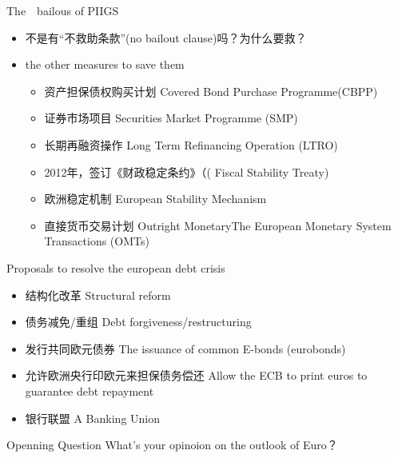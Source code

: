 \documentclass[10pt,hyperref={CJKbookmarks=true},xcolor=dvipsnames,aspectratio=169]{beamer}
\begin{document}
\begin{frame}{The　bailous of PIIGS}
		\begin{itemize}
			\item 不是有“不救助条款”(no bailout clause)吗？为什么要救？
			\item the other measures to save them
			\begin{itemize}
				\item 资产担保债权购买计划 Covered Bond Purchase Programme(CBPP)
				\item 证券市场项目 Securities Market	Programme (SMP)
				\item 长期再融资操作 Long Term Refinancing Operation (LTRO)
				\item 2012年，签订《财政稳定条约》（( Fiscal Stability
				Treaty)		
				\item 	欧洲稳定机制 European Stability Mechanism
				\item 直接货币交易计划 Outright MonetaryThe European Monetary System Transactions (OMTs)
							
		\end{itemize}
		\end{itemize}
\end{frame}

\begin{frame}{Proposals to resolve the european debt crisis}
	\begin{itemize}
	\item 结构化改革 Structural reform
	\item 债务减免/重组 Debt forgiveness/restructuring
	\item 发行共同欧元债券 The issuance of common E-bonds (eurobonds)
	\item 允许欧洲央行印欧元来担保债务偿还 Allow the ECB to print euros to guarantee debt repayment
	\item 银行联盟 A Banking Union
\end{itemize}
\begin{block}{Openning Question}
	What's your opinoion on the outlook of Euro？
\end{block}
\end{frame}
\end{document}
